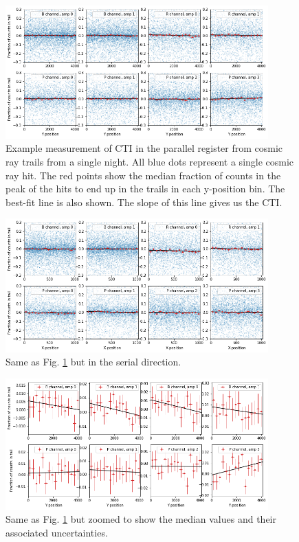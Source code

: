 \begin{figure}
    \centering
    \includegraphics[width=0.9\textwidth]{figures/cte/single_night_example_parallel.png}
    \caption{Example measurement of CTI in the parallel register from cosmic ray trails from a single night. All blue dots represent a single cosmic ray hit. The red points show the median fraction of counts in the peak of the hits to end up in the trails in each y-position bin. The best-fit line is also shown. The slope of this line gives us the CTI.}
    \label{fig:cte_single_night}
\end{figure}

\begin{figure}
    \centering
    \includegraphics[width=0.9\textwidth]{figures/cte/single_night_example_serial.png}
    \caption{Same as Fig. \ref{fig:cte_single_night} but in the serial direction.}
    \label{fig:cte_single_night_serial}
\end{figure}

\begin{figure}
    \centering
    \includegraphics[width=0.9\textwidth]{figures/cte/single_night_example_parallel_medians.png}
    \caption{Same as Fig. \ref{fig:cte_single_night} but zoomed to show the median values and their associated uncertainties.}
    \label{fig:cte_single_night_medians}
\end{figure}

